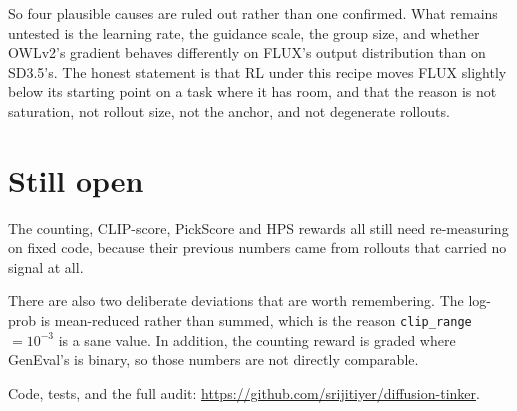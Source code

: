 \documentclass[11pt]{article}
\newcommand{\code}[1]{\texttt{\small #1}}
\begin{document}
So four plausible causes are ruled out rather than one confirmed. What remains untested is the learning rate, the guidance scale, the group size, and whether OWLv2's gradient behaves differently on FLUX's output distribution than on SD3.5's. The honest statement is that RL under this recipe moves FLUX slightly below its starting point on a task where it has room, and that the reason is not saturation, not rollout size, not the anchor, and not degenerate rollouts.

\section{Still open}

The counting, CLIP-score, PickScore and HPS rewards all still need re-measuring on fixed code, because their previous numbers came from rollouts that carried no signal at all.

There are also two deliberate deviations that are worth remembering. The log-prob is mean-reduced rather than summed, which is the reason \code{clip\_range}$=10^{-3}$ is a sane value. In addition, the counting reward is graded where GenEval's is binary, so those numbers are not directly comparable.

\vspace{0.5em}
\noindent Code, tests, and the full audit: \url{https://github.com/srijitiyer/diffusion-tinker}.
\end{document}
